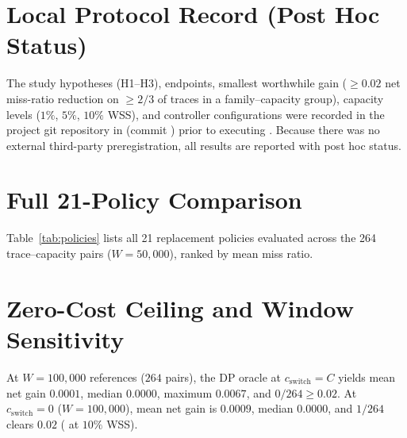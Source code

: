 \documentclass[10pt,twocolumn]{article}
\begin{document}

\section{Local Protocol Record (Post Hoc Status)}
\label{sec:protocol}
The study hypotheses (H1--H3), endpoints, smallest worthwhile gain ($\ge 0.02$ net miss-ratio reduction on $\ge 2/3$ of traces in a family--capacity group), capacity levels ($1\%$, $5\%$, $10\%$ WSS), and controller configurations were recorded in the project git repository in  (commit ) prior to executing . Because there was no external third-party preregistration, all results are reported with post hoc status.

\section{Full 21-Policy Comparison}
\label{sec:policies}
Table~\ref{tab:policies} lists all 21 replacement policies evaluated across the 264 trace--capacity pairs ($W=50{,}000$), ranked by mean miss ratio.

\begin{table}[h]
\centering
\scriptsize
\caption{All 21 Policies Across 264 Trace--Capacity Pairs}
\label{tab:policies}

\end{table}

\section{Zero-Cost Ceiling and Window Sensitivity}
\label{sec:zerocost}
\label{sec:window}
At $W=100{,}000$ references ($264$ pairs), the DP oracle at $c_{\text{switch}}=C$ yields mean net gain $0.0001$, median $0.0000$, maximum $0.0067$, and $0/264 \ge 0.02$. At $c_{\text{switch}}=0$ ($W=100{,}000$), mean net gain is $0.0009$, median $0.0000$, and $1/264$ clears $0.02$ ( at $10\%$ WSS).
\end{document}
